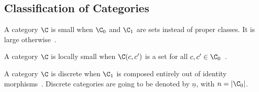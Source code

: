\subsection{Classification of Categories}

\begin{definition}

  A category $\C$ is small when $\C_0$ and $\C_1$ are sets instead of proper
  classes. It is large otherwise~\parencite[p.~24]{awodey:category_theory}.
\end{definition}

\begin{definition}

  A category $\C$ is locally small when $\C(c, c')$ is a set for all $c,c'\in
  \C_0$~\parencite[p.~25]{awodey:category_theory}.
\end{definition}

\begin{definition}

  A category $\C$ is discrete when $\C_1$ is composed entirely out of identity
  morphisms~\parencite[p.~11]{awodey:category_theory}. Discrete categories are
  going to be denoted by $\underline{n}$, with $n=|\C_0|$.
\end{definition}